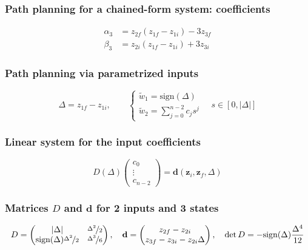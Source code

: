 \subsubsection{Path planning for a chained-form system: coefficients}
\begin{align*}
    \alpha_3&=z_{2f}(z_{1f}-z_{1i})-3z_{3f}\\
    \beta_3&=z_{2i}(z_{1f}-z_{1i})+3z_{3i}
\end{align*}

\subsubsection{Path planning via parametrized inputs}
\begin{equation*}
    \Delta=z_{1f}-z_{1i},\qquad
    \begin{cases}
        \tilde w_1=\text{sign}(\Delta)\\
        \tilde w_2=\displaystyle\sum_{j=0}^{n-2}c_js^j
    \end{cases}\quad s\in[0,|\Delta|]
\end{equation*}

\subsubsection{Linear system for the input coefficients}
\begin{equation*}
    D(\Delta)\begin{pmatrix}c_0\\\vdots\\c_{n-2}\end{pmatrix}=\mathbf d(\mathbf z_i,\mathbf z_f,\Delta)
\end{equation*}

\subsubsection{Matrices $D$ and $\mathbf d$ for 2 inputs and 3 states}
\begin{equation*}
    D=\begin{pmatrix}|\Delta|&\nicefrac{\Delta^2}{2}\\ \text{sign}(\Delta)\nicefrac{\Delta^2}{2}&\nicefrac{\Delta^3}{6}\end{pmatrix},\quad
    \mathbf d=\begin{pmatrix}z_{2f}-z_{2i}\\z_{3f}-z_{3i}-z_{2i}\Delta\end{pmatrix},\quad
    \det D=-\text{sign}(\Delta)\frac{\Delta^4}{12}
\end{equation*}


